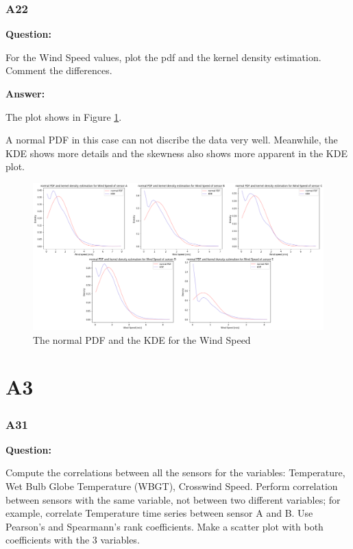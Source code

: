 \documentclass[a4paper]{article}
\numberwithin{figure}{section}
\numberwithin{table}{section}
\begin{document}
\section{A22}

\textbf{Question:}

For the Wind Speed values, plot the pdf and the kernel density estimation. Comment the differences.

\textbf{Answer:}

The plot shows in Figure \ref{Fig:A22}.

A normal PDF in this case can not discribe the data very well. Meanwhile, the KDE shows more details and the skewness also shows more apparent in the KDE plot.

\begin{figure}
\centering
\includegraphics[scale=0.34]{Figures/figA22.png}
\caption{The normal PDF and the KDE for the Wind Speed}
\label{Fig:A22}
\end{figure}

\part{A3}

\section{A31}

\textbf{Question:}

Compute the correlations between all the sensors for the variables: Temperature, Wet Bulb Globe Temperature (WBGT), Crosswind Speed. Perform correlation between sensors with the same variable, not between two different variables; for example, correlate Temperature time series between sensor A and B. Use Pearson’s and Spearmann’s rank coefficients. Make a scatter plot with both coefficients with the 3 variables.
\end{document}
